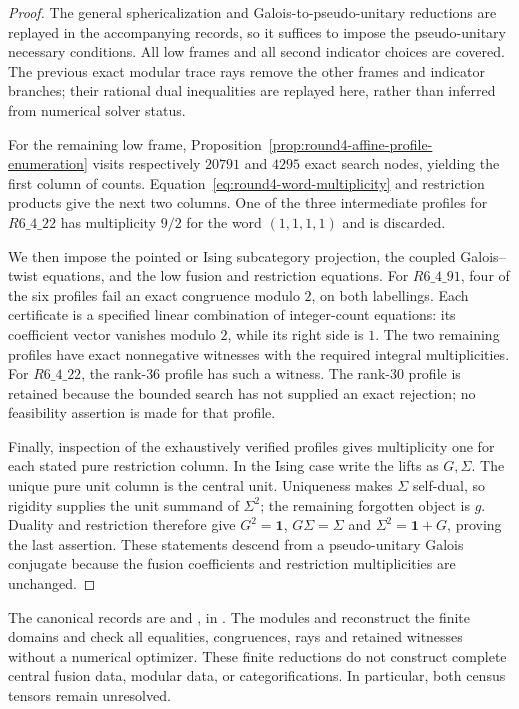 \begin{proof}
The general sphericalization and Galois-to-pseudo-unitary reductions are
replayed in the accompanying records, so it suffices to impose the
pseudo-unitary necessary conditions.  All low frames and all second
indicator choices are covered.  The previous exact modular trace rays
remove the other frames and indicator branches; their rational dual
inequalities are replayed here, rather than inferred from numerical
solver status.

For the remaining low frame, Proposition~\ref{prop:round4-affine-profile-enumeration}
visits respectively $20791$ and $4295$ exact search nodes, yielding the
first column of counts.  Equation~\eqref{eq:round4-word-multiplicity} and
restriction products give the next two columns.  One of the three
intermediate profiles for $R6\_4\_22$ has multiplicity $9/2$ for the word
$(1,1,1,1)$ and is discarded.

We then impose the pointed or Ising subcategory projection, the coupled
Galois--twist equations, and the low fusion and restriction equations.
For $R6\_4\_91$, four of the six profiles fail an exact congruence modulo
$2$, on both labellings.  Each certificate is a specified linear
combination of integer-count equations: its coefficient vector vanishes
modulo $2$, while its right side is $1$.  The two remaining profiles have
exact nonnegative witnesses with the required integral multiplicities.
For $R6\_4\_22$, the rank-$36$ profile has such a witness.  The rank-$30$
profile is retained because the bounded search has not supplied an exact
rejection; no feasibility assertion is made for that profile.

Finally, inspection of the exhaustively verified profiles gives
multiplicity one for each stated pure restriction column.  In the Ising
case write the lifts as $G,\Sigma$.  The unique pure unit column is the
central unit.  Uniqueness makes $\Sigma$ self-dual, so rigidity supplies
the unit summand of $\Sigma^2$; the remaining forgotten object is $g$.
Duality and restriction therefore give
$G^2=\mathbf1$, $G\Sigma=\Sigma$ and
$\Sigma^2=\mathbf1+G$, proving the last assertion.  These statements descend
from a pseudo-unitary Galois conjugate because the fusion coefficients and
restriction multiplicities are unchanged.
\end{proof}

The canonical records are
 and
, in
.  The modules
 and
 reconstruct the finite domains and check
all equalities, congruences, rays and retained witnesses without a
numerical optimizer.  These finite reductions do not construct complete
central fusion data, modular data, or categorifications.  In particular,
both census tensors remain unresolved.
